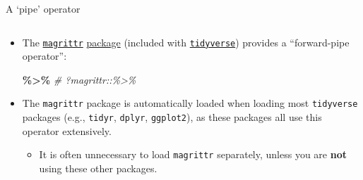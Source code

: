 \documentclass[
  11pt,
  ignorenonframetext,
]{beamer}
\newenvironment{Shaded}{\begin{snugshade}}{\end{snugshade}}
\newcommand{\CommentTok}[1]{\textcolor[rgb]{0.56,0.35,0.01}{\textit{#1}}}
\newcommand{\SpecialCharTok}[1]{\textcolor[rgb]{0.81,0.36,0.00}{\textbf{#1}}}
\providecommand{\tightlist}{%
  \setlength{\itemsep}{0pt}\setlength{\parskip}{0pt}}
\begin{document}
\begin{frame}{A `pipe' operator}
\begin{columns}[c,onlytextwidth]
\begin{column}{0.58\textwidth}
\begin{itemize}
\item
  The \href{https://magrittr.tidyverse.org/}{\texttt{magrittr}}
  \href{https://cran.r-project.org/package=magrittr}{package} (included
  with
  \href{https://www.tidyverse.org/packages/\#program}{\texttt{tidyverse}})
  provides a ``forward-pipe operator'':

\begin{Shaded}
\begin{Highlighting}[]
\SpecialCharTok{\%\textgreater{}\%}    \CommentTok{\# ?magrittr::\textasciigrave{}\%\textgreater{}\%\textasciigrave{}}
\end{Highlighting}
\end{Shaded}
\item
  The \texttt{magrittr} package is automatically loaded when loading
  most \texttt{tidyverse} packages (e.g., \texttt{tidyr},
  \texttt{dplyr}, \texttt{ggplot2}), as these packages all use this
  operator extensively.

  \begin{itemize}
  \tightlist
  \item
    It is often unnecessary to load \texttt{magrittr} separately, unless
    you are \textbf{not} using these other packages.
  \end{itemize}
\end{itemize}
\end{column}
\end{columns}

\end{frame}
\end{document}
